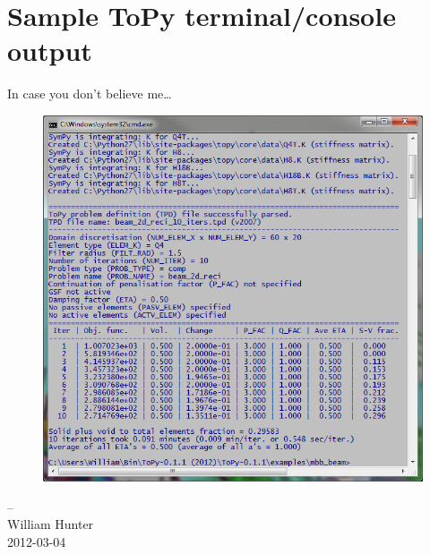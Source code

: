 \documentclass[10pt, a4paper]{article}
\begin{document}
\section{Sample ToPy terminal/console output}
In case you don't believe me\ldots
\begin{figure}[!ht]
\centering
\includegraphics[width=160mm]{CWindowssystem32cmd.png}
\end{figure}


--\\
\textsf{William Hunter}\\
2012-03-04
\end{document}

